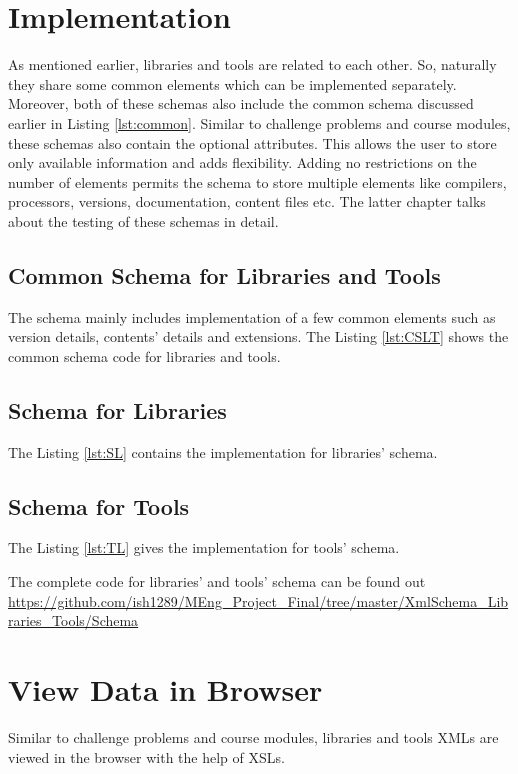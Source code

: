 \documentclass[11pt,letterpaper]{report}
\begin{document}
\section{Implementation}
As mentioned earlier, libraries and tools are related to each other. So, naturally they share some common elements which can be implemented separately. Moreover, both of these schemas also include the common schema discussed earlier in Listing \ref{lst:common}. Similar to challenge problems and course modules, these schemas also contain the optional attributes. This allows the user to store only available information and adds flexibility. Adding no restrictions on the number of elements permits the schema to store multiple elements like compilers, processors, versions, documentation, content files etc. The latter chapter talks about the testing of these schemas in detail. 
\subsection{Common Schema for Libraries and Tools}
The schema mainly includes implementation of a few common elements such as version details, contents' details and extensions. The Listing \ref{lst:CSLT} shows the common schema code for libraries and tools.
  
\subsection{Schema for Libraries}
The Listing \ref{lst:SL} contains the implementation for libraries' schema. 

\subsection{Schema for Tools}
The Listing \ref{lst:TL} gives the implementation for tools' schema. 


\bigskip
The complete code for libraries' and tools' schema can be found out \url{https://github.com/ish1289/MEng_Project_Final/tree/master/XmlSchema_Libraries_Tools/Schema}
\section*{View Data in Browser}
Similar to challenge problems and course modules, libraries and tools XMLs are viewed in the browser with the help of XSLs. 
\end{document}
